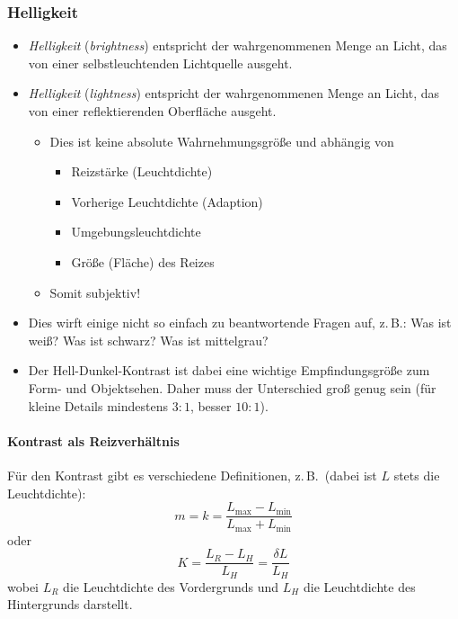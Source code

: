 \documentclass[a4paper, 11pt, accentcolor = tud3b]{tudreport}
\newcommand{\zB}{z.\,B.~}
\begin{document}
				\subsubsection{Helligkeit}
					\begin{itemize}
						\item \emph{Helligkeit} (\emph{brightness}) entspricht der wahrgenommenen Menge an Licht, das von einer selbstleuchtenden Lichtquelle ausgeht.
						\item \emph{Helligkeit} (\emph{lightness}) entspricht der wahrgenommenen Menge an Licht, das von einer reflektierenden Oberfläche ausgeht.
							\begin{itemize}
								\item Dies ist keine absolute Wahrnehmungsgröße und abhängig von
									\begin{itemize}
										\item Reizstärke (Leuchtdichte)
										\item Vorherige Leuchtdichte (Adaption)
										\item Umgebungsleuchtdichte
										\item Größe (Fläche) des Reizes
									\end{itemize}
								\item Somit subjektiv!
							\end{itemize}
						\item Dies wirft einige nicht so einfach zu beantwortende Fragen auf, z.\,B.: Was ist weiß? Was ist schwarz? Was ist mittelgrau?
						\item Der Hell-Dunkel-Kontrast ist dabei eine wichtige Empfindungsgröße zum Form- und Objektsehen. Daher muss der Unterschied groß genug sein (für kleine Details mindestens \(3:1\), besser \(10:1\)).
					\end{itemize}

					\paragraph{Kontrast als Reizverhältnis}
						Für den Kontrast gibt es verschiedene Definitionen, \zB (dabei ist \(L\) stets die Leuchtdichte):
						\begin{equation*}
							m = k = \frac{L_\text{max} - L_\text{min}}{L_\text{max} + L_\text{min}}
						\end{equation*}
						oder
						\begin{equation*}
							K = \frac{L_R - L_H}{L_H} = \frac{\delta L}{L_H}
						\end{equation*}
						wobei \( L_R \) die Leuchtdichte des Vordergrunds und \(L_H\) die Leuchtdichte des Hintergrunds darstellt.
						
\end{document}
